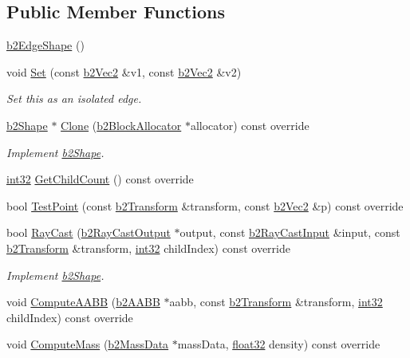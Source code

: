 \subsection*{Public Member Functions}
\begin{DoxyCompactItemize}
\item 
\mbox{\hyperlink{classb2_edge_shape_ab1a6b6e22c725215c3bbbe093a7d44c0}{b2\+Edge\+Shape}} ()
\item 
void \mbox{\hyperlink{classb2_edge_shape_a67dd3b17630a600033cb4380697a4e9d}{Set}} (const \mbox{\hyperlink{structb2_vec2}{b2\+Vec2}} \&v1, const \mbox{\hyperlink{structb2_vec2}{b2\+Vec2}} \&v2)
\begin{DoxyCompactList}\small\item\em Set this as an isolated edge. \end{DoxyCompactList}\item 
\mbox{\hyperlink{classb2_shape}{b2\+Shape}} $\ast$ \mbox{\hyperlink{classb2_edge_shape_a52ed696717f44ed02b7a88ccf201563c}{Clone}} (\mbox{\hyperlink{classb2_block_allocator}{b2\+Block\+Allocator}} $\ast$allocator) const override
\begin{DoxyCompactList}\small\item\em Implement \mbox{\hyperlink{classb2_shape}{b2\+Shape}}. \end{DoxyCompactList}\item 
\mbox{\hyperlink{b2_settings_8h_a43d43196463bde49cb067f5c20ab8481}{int32}} \mbox{\hyperlink{classb2_edge_shape_ae9dcaa2f4b77fcf182d29159658da82a}{Get\+Child\+Count}} () const override
\item 
bool \mbox{\hyperlink{classb2_edge_shape_a15151673cf9ad585779c70363425f470}{Test\+Point}} (const \mbox{\hyperlink{structb2_transform}{b2\+Transform}} \&transform, const \mbox{\hyperlink{structb2_vec2}{b2\+Vec2}} \&p) const override
\item 
bool \mbox{\hyperlink{classb2_edge_shape_a192cf10bd556a5a90b29a2bcee2ddd75}{Ray\+Cast}} (\mbox{\hyperlink{structb2_ray_cast_output}{b2\+Ray\+Cast\+Output}} $\ast$output, const \mbox{\hyperlink{structb2_ray_cast_input}{b2\+Ray\+Cast\+Input}} \&input, const \mbox{\hyperlink{structb2_transform}{b2\+Transform}} \&transform, \mbox{\hyperlink{b2_settings_8h_a43d43196463bde49cb067f5c20ab8481}{int32}} child\+Index) const override
\begin{DoxyCompactList}\small\item\em Implement \mbox{\hyperlink{classb2_shape}{b2\+Shape}}. \end{DoxyCompactList}\item 
void \mbox{\hyperlink{classb2_edge_shape_a238139ae1736b457d77443133ff16854}{Compute\+A\+A\+BB}} (\mbox{\hyperlink{structb2_a_a_b_b}{b2\+A\+A\+BB}} $\ast$aabb, const \mbox{\hyperlink{structb2_transform}{b2\+Transform}} \&transform, \mbox{\hyperlink{b2_settings_8h_a43d43196463bde49cb067f5c20ab8481}{int32}} child\+Index) const override
\item 
void \mbox{\hyperlink{classb2_edge_shape_ac738c1e0ab2f4dfbab26e3942efa60af}{Compute\+Mass}} (\mbox{\hyperlink{structb2_mass_data}{b2\+Mass\+Data}} $\ast$mass\+Data, \mbox{\hyperlink{b2_settings_8h_aacdc525d6f7bddb3ae95d5c311bd06a1}{float32}} density) const override
\end{DoxyCompactItemize}

